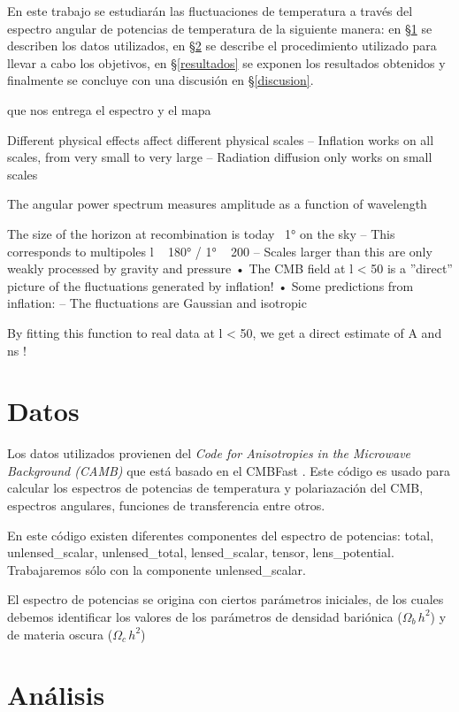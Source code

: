 \documentclass[twocolumn,letterpaper,spanish]{revtex4}
\numberwithin{equation}{section}
\begin{document}
En este trabajo se estudiar\'an las fluctuaciones de temperatura a trav\'es del espectro angular de potencias de temperatura de la siguiente manera: en §\ref{datos} se describen los datos utilizados, en §\ref{analisis} se describe el procedimiento utilizado para llevar a cabo los objetivos, en §\ref{resultados} se exponen los resultados obtenidos y finalmente se concluye con una discusi\'on en §\ref{discusion}.


que nos entrega el espectro y el mapa


Different physical effects affect different physical scales
– Inflation works on all scales, from very small to very large
– Radiation diffusion only works on small scales

The angular power
spectrum measures
amplitude as a
function of wavelength

The size of the horizon at recombination is today ~1° on the sky
– This corresponds to multipoles l ~ 180° / 1° ~ 200
– Scales larger than this are only weakly processed by gravity and pressure
• The CMB field at l < 50 is a ”direct” picture of the fluctuations
generated by inflation!
• Some predictions from inflation:
– The fluctuations are Gaussian and isotropic

By fitting this function to real data at l < 50, we get a direct estimate of
A and ns
!
\section{Datos}\label{datos}

Los datos utilizados provienen del \textit{Code for Anisotropies in the Microwave Background (CAMB)} que est\'a basado en el CMBFast \citep{cmbfast}. Este c\'odigo es usado para calcular los espectros de potencias de temperatura y polariazaci\'on del CMB, espectros angulares, funciones de transferencia entre otros.

 En este c\'odigo existen diferentes componentes del espectro de potencias: total, unlensed\_scalar, unlensed\_total, lensed\_scalar, tensor, lens\_potential. Trabajaremos s\'olo con la componente unlensed\_scalar.

El espectro de potencias se origina con ciertos par\'ametros iniciales, de los cuales debemos identificar los valores de los par\'ametros de densidad bari\'onica ($\Omega_b\,h^2$) y de materia oscura ($\Omega_c\,h^2$)

\section{An\'alisis}\label{analisis}
\end{document}
